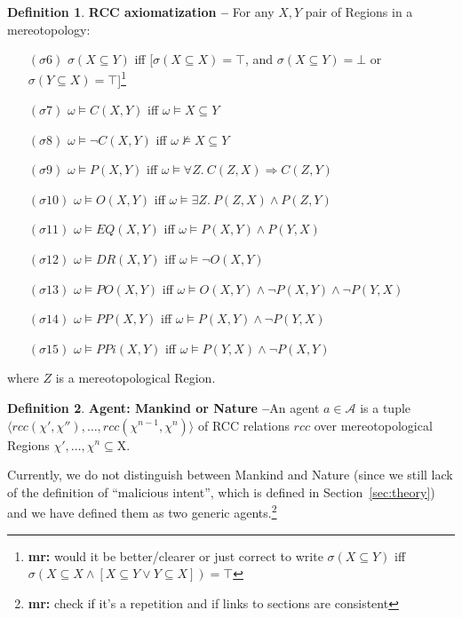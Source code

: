 \documentclass{article}
\newcommand{\fixnote}[2]{\textbf{\color{red}{FIX}}\footnote{{\bf #1:} #2}}
\theoremstyle{definition}
\newtheorem{definition}{Definition}[section]
\theoremstyle{corollary}
\theoremstyle{lemma}
\theoremstyle{theorem}
\theoremstyle{theorem}
\newcommand{\world}{\omega}
\newcommand{\interpretation}{\sigma}
\newcommand{\region}{\chi}
\newcommand{\Region}{\mathrm{X}}
\newcommand{\agentuniverse}{\mathcal{A}}
\newcommand{\agent}{a}
\newcommand{\rcc}{rcc}
\newcommand{\connects}[2]{C(#1,#2)}
\newcommand{\disconnected}[2]{\neg C(#1,#2)}
\newcommand{\partof}[2]{P(#1,#2)}
\newcommand{\overlaps}[2]{O(#1,#2)}
\newcommand{\eq}[2]{EQ(#1,#2)}
\newcommand{\pp}[2]{PP(#1,#2)}
\newcommand{\po}[2]{PO(#1,#2)}
\newcommand{\ppi}[2]{PPi(#1,#2)}
\newcommand{\dr}[2]{DR(#1,#2)}
\begin{document}
\begin{definition}{\bf RCC axiomatization --}
	For any $X,Y$ pair of Regions in a mereotopology:
	\begin{itemize}[noitemsep]
	\item[$(\interpretation6)$] $\interpretation(X\subseteq Y)$ iff [$\interpretation(X\subseteq X)=\top$, and $\interpretation(X\subseteq Y)=\bot$ or $\interpretation(Y\subseteq X)=\top$]\fixnote{mr}{would it be better/clearer or just correct to write $\sigma(X\subseteq Y)$ iff $\sigma(X\subseteq X\wedge [X\subseteq Y \vee Y\subseteq X])=\top$}
	\item[$(\interpretation7)$] $\world\models\connects{X}{Y}$ iff $\world\models X\subseteq Y$ 
	\item[$(\interpretation8)$] $\world\models\disconnected{X}{Y}$ iff  $\world\not\models X\subseteq Y$
	\item[$(\interpretation9)$] $\world\models\partof{X}{Y}$ iff $\world\models\forall Z.~\connects{Z}{X}\Rightarrow\connects{Z}{Y}$
	\item[$(\interpretation10)$] $\world\models\overlaps{X}{Y}$ iff $\world\models\exists Z.~\partof{Z}{X}\wedge\partof{Z}{Y}$
	\item[$(\interpretation11)$] $\world\models\eq{X}{Y}$ iff $\world\models\partof{X}{Y}\wedge\partof{Y}{X}$
	\item[$(\interpretation12)$] $\world\models\dr{X}{Y}$ iff $\world\models\neg\overlaps{X}{Y}$
	\item[$(\interpretation13)$] $\world\models\po{X}{Y}$ iff $\world\models\overlaps{X}{Y}\wedge\neg\partof{X}{Y}\wedge\neg\partof{Y}{X}$
	\item[$(\interpretation14)$] $\world\models\pp{X}{Y}$ iff $\world\models\partof{X}{Y}\wedge\neg\partof{Y}{X}$
	\item[$(\interpretation15)$] $\world\models\ppi{X}{Y}$ iff $\world\models\partof{Y}{X}\wedge\neg\partof{X}{Y}$
\end{itemize}
where $Z$ is a mereotopological Region.
\end{definition}

\begin{definition}{\bf Agent: Mankind or Nature --}\label{def:agent}
	An agent $\agent\in\agentuniverse$ is a tuple
	$\langle\rcc(\region',\region''),\ldots,\rcc(\region^{n-1},\region^n)\rangle$
	of RCC relations $\rcc$ over mereotopological Regions
	${\region',\ldots,\region^n}\subseteq\Region$. 
\end{definition}

Currently, we do not distinguish between Mankind and Nature (since we still
lack of the definition of ``malicious intent'', which is defined in
Section~\ref{sec:theory}) and we have defined them as two generic
agents.\fixnote{mr}{check if it's a repetition and if links to sections are
consistent}
\end{document}
